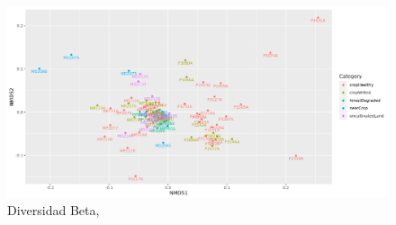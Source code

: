 \begin{figure}[!]
\centering
\includegraphics[width=\textwidth]{Img/cap2/AllData_Beta_diversidad.png}
\caption{Diversidad Beta, }
\end{figure}